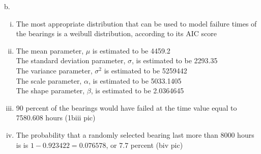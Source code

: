 \documentclass[14pt]{article}
\begin{document}
b.
\begin{enumerate}[(i)]

\item
The most appropriate distribution that can be used to model failure times of the bearings is a weibull distribution, according to its AIC score

\item
The mean parameter, $\mu$ is estimated to be 4459.2 \\
The standard deviation parameter, $\sigma$, is estimated to be 2293.35 \\
The variance parameter, $\sigma^2$ is estimated to be 5259442 \\
The scale parameter, $\alpha$, is estimated to be 5033.1405 \\
The shape parameter, $\beta$, is estimated to be 2.0364645

\item
90 percent of the bearings would have failed at the time value equal to 7580.608 hours (1biii pic)

\item
The probability that a randomly selected bearing last more than 8000 hours is is $1 - 0.923422 = 0.076578$, or 7.7 percent (biv pic)


\end{enumerate}
\end{document}
